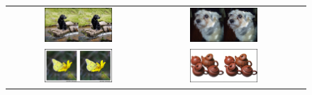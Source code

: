 \documentclass{article}
\begin{document}
\begin{figure}
    \centering
\begin{tabular}{@{}ccc@{}}
     \includegraphics[width=0.5\textwidth]{figures/upsampled/upsample_8.png} & \includegraphics[width=0.5\textwidth]{figures/upsampled/upsample_10.png} \\ \includegraphics[width=0.5\textwidth]{figures/upsampled/upsample_11.png} & \includegraphics[width=0.5\textwidth]{figures/upsampled/upsample_17.png} \\

\end{tabular}
\end{figure}
\end{document}

